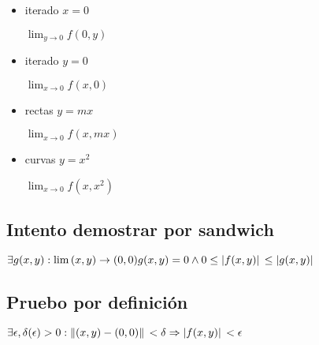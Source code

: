 \documentclass[../parcial.tex]{subfiles}
\begin{document}
\begin{enumerate}
            \begin{itemize}
                \item iterado $ x = 0$

                    $\lim_{y\to0} f(0,y)$

                \item iterado $ y = 0$

                    $\lim_{x\to0} f(x,0)$

                \item rectas $ y = mx$
                
                    $\lim_{x\to0} f(x,mx)$

                \item curvas $ y = x^2$

                    $\lim_{x\to0} f(x,x^2)$

            \end{itemize}

            \subsection*{Intento demostrar por sandwich}
        
            $ \exists g(x,y): \lim{(x,y)\to(0,0)} g(x,y) = 0 \wedge 0 \leq \abs*{f(x,y)} \leq \abs*{g(x,y)} $
        
            \subsection*{Pruebo por definición}

            $ \exists \epsilon,\delta(\epsilon) > 0 : \norm*{(x,y) - (0,0)} < \delta \Rightarrow \abs*{f(x,y)} < \epsilon $

    \end{enumerate}
\end{document}
